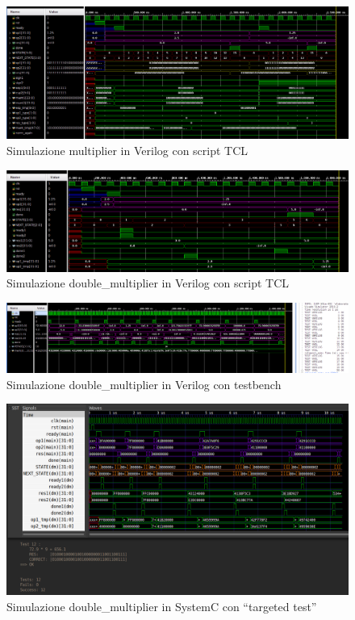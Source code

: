 \documentclass[]{IEEEtran}
\begin{document}
\begin{figure}[bt]
    \centering
    \includegraphics[width=\textwidth]{figures/sim_mult_verilog}
    \caption{Simulazione multiplier in Verilog con script TCL}
    \label{fig:SIM_MULT_VERILOG}
\end{figure}

\begin{figure}[bt]
    \centering
    \includegraphics[width=\textwidth]{figures/sim_dm}
    \caption{Simulazione double\_multiplier in Verilog con script TCL}
    \label{fig:SIM_DM}
\end{figure}

\begin{figure}[bt]
    \centering
    \includegraphics[width=\textwidth]{figures/sim_testbench}
    \caption{Simulazione double\_multiplier in Verilog con testbench}
    \label{fig:SIM_TESTBENCH}
\end{figure}

\begin{figure}[bt]
    \centering
    \includegraphics[width=\textwidth]{figures/sim_systemc_target}
    \caption{Simulazione double\_multiplier in SystemC con ``targeted test''}
    \label{fig:SIM_SC_TARGET}
\end{figure}
\end{document}
